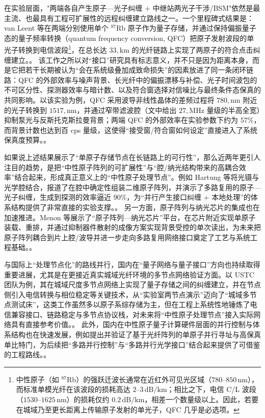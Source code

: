 在实验层面，"两端各自产生原子—光子纠缠 + 中继站两光子干涉/BSM"依然是最主流、也最具有工程可扩展性的远程纠缠建立路线之一。一个里程碑式结果是：van Leent 等在两端分别使用单个 $^{87}$Rb 原子作为量子存储，并通过保持偏振量子态的量子频率转换（quantum frequency conversion, QFC）把原子发射波段的单光子转换到电信波段\footnote{中性原子（如 $^{87}$Rb）的强跃迁波长通常在近红外可见光区域（$780$--$850\,\mathrm{nm}$），而标准单模光纤在该波段的损耗高达 $2$--$3\,\mathrm{dB/km}$；相比之下，电信 C/L 波段（$1530$--$1625\,\mathrm{nm}$）的损耗仅约 $0.2\,\mathrm{dB/km}$，相差一个数量级以上。因此，若要在城域乃至更长距离上传输原子发射的单光子，QFC 几乎是必选项。}，在总长达 $33,\mathrm{km}$ 的光纤链路上实现了两原子的符合点击纠缠建立。\cite{vanleent2022entangling}。%
该工作之所以对“接口”研究具有标志意义，并不只是因为距离本身，而是它把若干长期被认为“会在系统级叠加成致命损失”的因素放进了同一条闭环链路：QFC 的外部效率与噪声背景、长光纤中的偏振漂移与补偿、光子时间波包的不可区分性、探测器效率与暗计数、以及符合窗选择对信噪比与最终条件态保真的共同影响。以该实验为例，QFC 采用波导非线性晶体的差频过程将 $780,\mathrm{nm}$ 附近的光子转换到 $1517,\mathrm{nm}$，并通过窄带滤波腔（文中给出 $27,\mathrm{MHz}$ 量级的半高全宽）抑制泵光与反斯托克斯拉曼背景；两端 QFC 的外部效率在实验参数下约为 $57\%$，而背景计数也达到百 cps 量级，这使得“接受窗/符合窗如何设定”直接进入了系统保真度预算。\cite{vanleent2022entangling}。%

如果说上述结果展示了“单原子存储节点在长链路上的可行性”，那么近两年更引人注目的趋势，是把“中性原子阵列的可扩展性”与“腔/纳光结构带来的高耦合效率”结合起来，形成真正意义上的“中性原子处理节点”。例如 Hartung 等将光镊与光学腔结合，报道了在腔中确定性组装二维原子阵列，并演示了多路复用的原子—光子纠缠，生成到探测的效率逼近 $90\%$，为“并行产生接口纠缠 + 本地处理”的体系结构提供了非常直接的实验支撑。\cite{Hartung2024QuantumNetworkRegisterTweezerCavity}。%
另一方面，原子阵列与纳光芯片的集成也在加速推进。Menon 等展示了“原子阵列—纳光芯片”平台，在芯片附近实现单原子装载、重排，并通过抑制器件散射的成像方案实现背景受控的单次读出，为未来把原子阵列耦合到片上腔/波导并进一步走向多路复用网络接口奠定了工艺与系统工程基础。\cite{Menon2024IntegratedAtomArrayNanophotonicChip}。%

与国际上“处理节点化”的路线并行，国内在“量子网络与量子接口”方向也持续取得重要进展，尤其是在更接近真实城域光纤环境的多节点网络验证方面。以 USTC 团队为例，其在城域尺度多节点网络上实现了量子存储之间的纠缠建立，并在节点侧引入电信转换与相位稳定等关键技术，从“实验室两节点演示”迈向了“城域多节点测试床”，这类工作虽然多以原子系综存储为主，但在工程上系统性地锤炼了电信兼容接口、链路稳定与多节点协议栈，对未来将“中性原子处理节点”接入实际网络具有直接参考价值。\cite{Liu2024MemoryMemoryEntanglementMetropolitanNetwork,Zhu2025RemoteQuantumNetworksQuantumMemories}。%
此外，国内在中性原子量子计算硬件层面的并行控制与体系结构也在快速发展，例如提出并验证了基于光纤阵列的单原子并行寻址与高保真单比特门，为后续把“多路并行控制”与“多路并行光学接口”结合起来提供了可借鉴的工程路线。\cite{Li2025FiberArrayArchitectureAtomQC}。%

